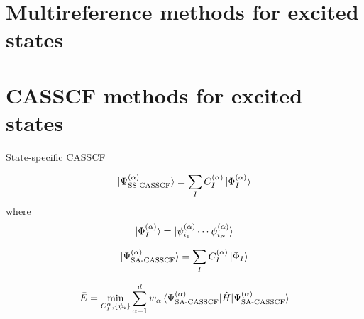 \documentclass[../Main/notes.tex]{subfiles}
\begin{document}
\section{Multireference methods for excited states}




\section{CASSCF methods for excited states}
State-specific CASSCF

\begin{equation}
\ket{\Psi_\text{SS-CASSCF}^{(\alpha)}} 
= \sum_I C_I^{(\alpha)} \ket{\Phi^{(\alpha)}_I}
\end{equation}
where
\begin{equation}
\ket{\Phi^{(\alpha)}_I} =  \ket{\psi^{(\alpha)}_{i_1} \cdots \psi^{(\alpha)}_{i_N}}
\end{equation}


\begin{equation}
\ket{\Psi_\text{SA-CASSCF}^{(\alpha)}} 
= \sum_I C_I^{(\alpha)} \ket{\Phi_I}
\end{equation}

\begin{equation}
\bar{E} = \min_{C_I^{\alpha}, \{ \psi_i \}} \sum_{\alpha = 1}^{d}
w_\alpha \braket{\Psi_\text{SA-CASSCF}^{(\alpha)} | \hat{H} | \Psi_\text{SA-CASSCF}^{(\alpha)}} 
\end{equation}

\end{document}
